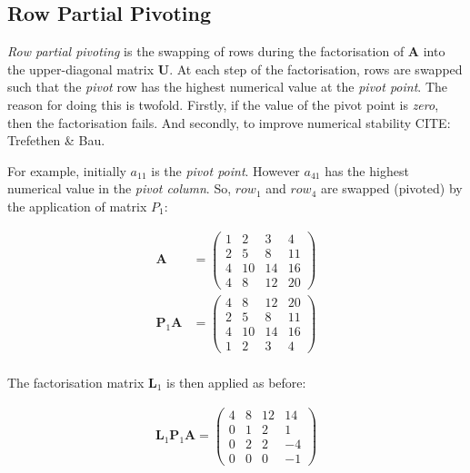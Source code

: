 %
%
\subsection{Row Partial Pivoting}

\emph{Row partial pivoting} is the swapping of rows during the factorisation of $\mathbf{A}$ into the upper-diagonal matrix $\mathbf{U}$. At each step of the factorisation, rows are swapped such that the \emph{pivot} row has the highest numerical value at the \emph{pivot point}. The reason for doing this is twofold. Firstly, if the value of the pivot point is \emph{zero}, then the factorisation fails. And secondly, to improve numerical stability CITE: Trefethen \& Bau.

For example, initially $a_{11}$ is the \emph{pivot point}. However $a_{41}$ has the highest numerical value in the \emph{pivot column}. So, $row_1$ and $row_4$ are swapped (pivoted) by the application of matrix $P_1$:

\begin{equation}
\begin{split}
\mathbf{A} &=
\begin{pmatrix}
1 & 2 & 3 & 4 \\
2 & 5 & 8 & 11 \\
4 & 10 & 14 & 16 \\
4 & 8 & 12 & 20 
\end{pmatrix} \\
\mathbf{P}_1\mathbf{A} &=
\begin{pmatrix}
4 & 8 & 12 & 20 \\
2 & 5 &  8 & 11 \\
4 & 10 & 14 & 16 \\
1 & 2 & 3 & 4
\end{pmatrix} \\
\end{split}
\end{equation}

The factorisation matrix $\mathbf{L}_1$ is then applied as before:
 
\begin{equation}
\begin{split}
\mathbf{L}_1\mathbf{P}_1\mathbf{A} =
\begin{pmatrix}
4 & 8 & 12 & 14 \\
0 & 1 & 2 & 1 \\
0 & 2 & 2 & -4 \\
0 & 0 & 0 & -1
\end{pmatrix} \\
\end{split}
\end{equation}

